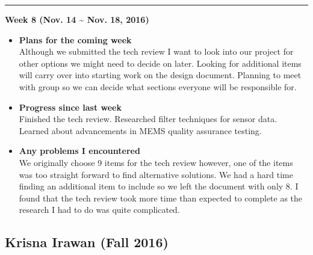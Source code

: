 		\rule{\textwidth}{0.5pt}

		\begin{center}
			\textbf{Week 8 (Nov. 14 {\textasciitilde{}} Nov. 18, 2016)}
		\end{center}
		\begin{itemize}
			\item \textbf{Plans for the coming week}
			\\ Although we submitted the tech review I want to look into our project for other options we might need to decide on later. Looking for additional items will carry over into starting work on the design document. Planning to meet with group so we can decide what sections everyone will be responsible for.\\

			\item \textbf{Progress since last week}
			\\Finished the tech review. Researched filter techniques for sensor data. Learned about advancements in MEMS quality assurance testing.\\

			\item \textbf{Any problems I encountered}
			\\We originally choose 9 items for the tech review however, one of the items was too straight forward to find alternative solutions. We had a hard time finding an additional item to include so we left the document with only 8. I found that the tech review took more time than expected to complete as the research I had to do was quite complicated.\\
		\end{itemize}


		\subsection{Krisna Irawan (Fall 2016)}
		\vspace{0.5cm}

